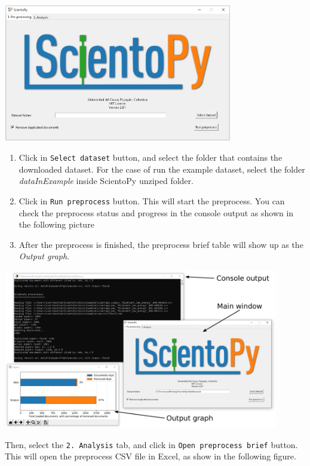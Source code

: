 \documentclass[10pt,letterpaper]{article}
\begin{document}
\begin{center}
	\includegraphics[width=0.75\textwidth]{./figures/win_preprocess.eps}
\end{center}

\begin{enumerate}
\item Click in \verb|Select dataset| button, and select the folder that contains the downloaded dataset. For the case of run the example dataset, select the folder \textit{dataInExample} inside ScientoPy unziped folder. 
\item Click in \verb|Run preprocess| button. This will start the preprocess. You can check the preprocess status and progress in the console output as shown in the following picture
\item After the preprocess is finished, the preprocess brief table will show up as the \textit{Output graph}. 
\end{enumerate}

\begin{center}
	\includegraphics[width=0.9\textwidth]{./figures/win_preprocess2.eps}
\end{center}

Then, select the \verb|2. Analysis| tab, and click in \verb|Open preprocess brief| button. This will open the preprocess CSV file in Excel, as show in the following figure.
\end{document}
